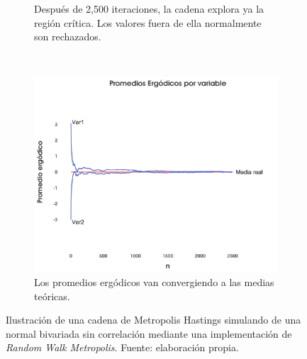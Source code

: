 \begin{figure}[h]
\begin{subfigure}{0.3\textwidth}
        \caption{Después de 2,500 iteraciones, la cadena explora ya la región crítica. Los valores fuera de ella normalmente son rechazados.}
    \end{subfigure}
    ~
    \begin{subfigure}{0.3\textwidth}
        \includegraphics[width=\textwidth]{Figs/Bayes/Ejemplo_RWM_C}
        \caption{Los promedios ergódicos van convergiendo a las medias teóricas.}
    \end{subfigure}
    \caption{Ilustración de una cadena de Metropolis Hastings simulando de una normal bivariada sin correlación mediante una implementación de \textit{Random Walk Metropolis}. Fuente: elaboración propia.}\label{fig:RWM}
\end{figure}

